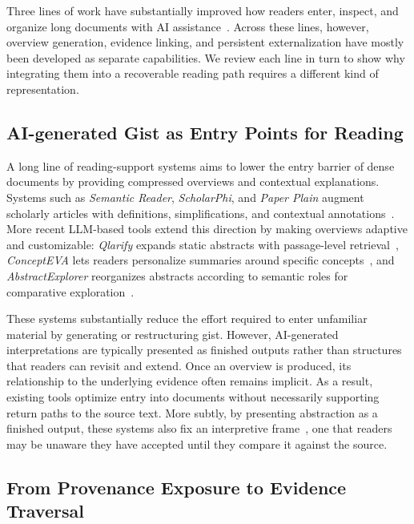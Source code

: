 \documentclass[manuscript,review,anonymous]{acmart}
\begin{document}
Three lines of work have substantially improved how readers enter, inspect, and organize long documents with AI assistance~\cite{semantic_reader,scholarphi,paper_plain,papertrail,liquidtext,sensecape}. Across these lines, however, overview generation, evidence linking, and persistent externalization have mostly been developed as separate capabilities. We review each line in turn to show why integrating them into a recoverable reading path requires a different kind of representation.

\subsection{AI-generated Gist as Entry Points for Reading}

A long line of reading-support systems aims to lower the entry barrier of dense documents by providing compressed overviews and contextual explanations. Systems such as \textit{Semantic Reader}, \textit{ScholarPhi}, and \textit{Paper Plain} augment scholarly articles with definitions, simplifications, and contextual annotations~\cite{semantic_reader,scholarphi,paper_plain}. More recent LLM-based tools extend this direction by making overviews adaptive and customizable: \textit{Qlarify} expands static abstracts with passage-level retrieval~\cite{qlarify}, \textit{ConceptEVA} lets readers personalize summaries around specific concepts~\cite{concepteva}, and \textit{AbstractExplorer} reorganizes abstracts according to semantic roles for comparative exploration~\cite{abstractexplorer}.

These systems substantially reduce the effort required to enter unfamiliar material by generating or restructuring gist. However, AI-generated interpretations are typically presented as finished outputs rather than structures that readers can revisit and extend. Once an overview is produced, its relationship to the underlying evidence often remains implicit. As a result, existing tools optimize entry into documents without necessarily supporting return paths to the source text. More subtly, by presenting abstraction as a finished output, these systems also fix an interpretive frame~\cite{tversky1981framing,pastorino2025framing,Qin2026AIPP}, one that readers may be unaware they have accepted until they compare it against the source.

\subsection{From Provenance Exposure to Evidence Traversal}
\end{document}
